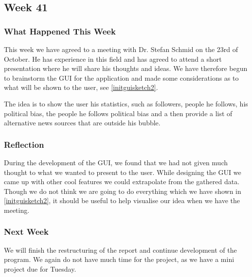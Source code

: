 \subsection{Week 41}\label{week41}
\subsubsection{What Happened This Week}
This week we have agreed to a meeting with Dr. Stefan Schmid on the 23rd of
October. He has experience in this field and has agreed to attend a short
presentation where he will share his thoughts and ideas. We have therefore
begun to brainstorm the \ac{GUI} for the application and made some
considerations as to what will be shown to the user, see
\autoref{initguisketch2}.\nl


The idea is to show the user his statistics, such as followers, people he
follows, his political bias, the people he follows political bias and a then
provide a list of alternative news sources that are outside his bubble.

\subsubsection{Reflection} 
During the development of the \ac{GUI}, we found that we had not given much
thought to what we wanted to present to the user. While designing the \ac{GUI}
we came up with other cool features we could extrapolate from the gathered
data. Though we do not think we are going to do everything which we have shown
in \autoref{initguisketch2}, it should be useful to help visualise our idea when
we have the meeting. 

\subsubsection{Next Week}
We will finish the restructuring of the report and continue development of the
program. We again do not have much time for the project, as we have a mini
project due for Tuesday.



% 
% 
% 
